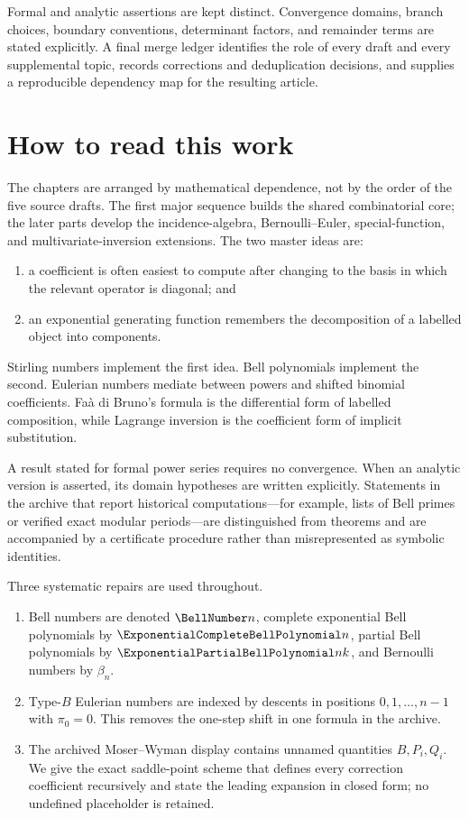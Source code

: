 \documentclass[11pt,a4paper,oneside,openany]{book}
\theoremstyle{definition}
\theoremstyle{remark}
\begin{document}
Formal and analytic assertions are kept distinct.  Convergence domains, branch
choices, boundary conventions, determinant factors, and remainder terms are stated
explicitly.  A final merge ledger identifies the role of every draft and every
supplemental topic, records corrections and deduplication decisions, and supplies a
reproducible dependency map for the resulting article.

\chapter*{How to read this work}
The chapters are arranged by mathematical dependence, not by the order of the five
source drafts.  The first major sequence builds the shared combinatorial core;
the later parts develop the incidence-algebra, Bernoulli--Euler, special-function,
and multivariate-inversion extensions.  The two master ideas are:
\begin{enumerate}
  \item a coefficient is often easiest to compute after changing to the basis in
        which the relevant operator is diagonal; and
  \item an exponential generating function remembers the decomposition of a
        labelled object into components.
\end{enumerate}
Stirling numbers implement the first idea.  Bell polynomials implement the second.
Eulerian numbers mediate between powers and shifted binomial coefficients.  Fa\`a di
Bruno's formula is the differential form of labelled composition, while Lagrange
inversion is the coefficient form of implicit substitution.

A result stated for formal power series requires no convergence.  When an analytic
version is asserted, its domain hypotheses are written explicitly.  Statements in
the archive that report historical computations---for example, lists of Bell
primes or verified exact modular periods---are distinguished from theorems and are
accompanied by a certificate procedure rather than misrepresented as symbolic
identities.

\begin{auditbox}
Three systematic repairs are used throughout.
\begin{enumerate}
\item Bell numbers are denoted $\BellNumber n$, complete exponential Bell polynomials by
      $\ExponentialCompleteBellPolynomial n$, partial Bell polynomials by $\ExponentialPartialBellPolynomial nk$, and Bernoulli numbers by
      $\beta_n$.
\item Type-$B$ Eulerian numbers are indexed by descents in positions
      $0,1,\ldots,n-1$ with $\pi_0=0$.  This removes the one-step shift in one formula
      in the archive.
\item The archived Moser--Wyman display contains unnamed quantities
      $B,P_i,Q_i$.  We give the exact saddle-point scheme that defines every
      correction coefficient recursively and state the leading expansion in closed
      form; no undefined placeholder is retained.
\end{enumerate}
\end{auditbox}
\end{document}
